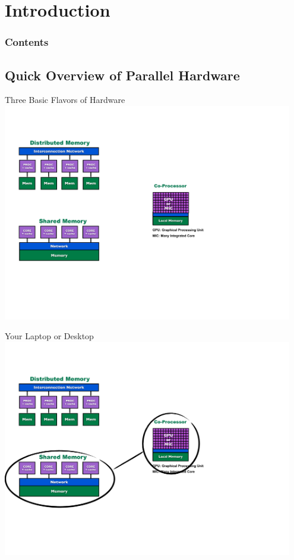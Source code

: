 \section{Introduction}

\hidenum
\begin{frame}[noframenumbering]
\frametitle{Contents}
 \tableofcontents[currentsection,hideothersubsections,sectionstyle=show/hide]
\end{frame}
\shownum

\subsection{Quick Overview of Parallel Hardware}

\begin{frame}
\begin{block}{Three Basic Flavors of Hardware}
    \includegraphics[width=0.95\textwidth]{../common/pics/ParallelHardware1.pdf}
\end{block}
\end{frame}

\begin{frame}
\begin{block}{Your Laptop or Desktop}
    \includegraphics[width=0.95\textwidth]{../common/pics/ParallelHardware2.pdf}
\end{block}
\end{frame}

